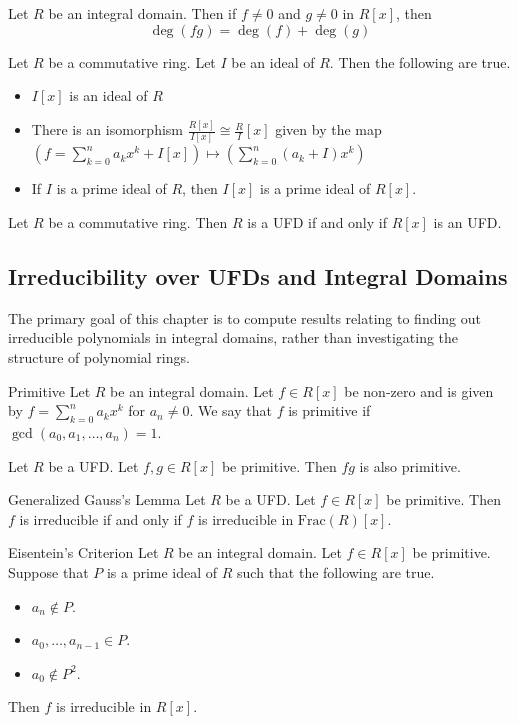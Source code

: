 \documentclass[a4paper]{article}
\begin{document}
\begin{prp}{}{} Let $R$ be an integral domain. Then if $f\neq 0$ and $g\neq 0$ in $R[x]$, then $$\deg(fg)=\deg(f)+\deg(g)$$
\end{prp}

\begin{prp}{}{} Let $R$ be a commutative ring. Let $I$ be an ideal of $R$. Then the following are true. 
\begin{itemize}
\item $I[x]$ is an ideal of $R$
\item There is an isomorphism $\frac{R[x]}{I[x]}\cong\frac{R}{I}[x]$ given by the map $\left(f=\sum_{k=0}^na_kx^k+I[x]\right)\mapsto\left(\sum_{k=0}^n(a_k+I)x^k\right)$
\item If $I$ is a prime ideal of $R$, then $I[x]$ is a prime ideal of $R[x]$. 
\end{itemize}
\end{prp}

\begin{prp}{}{} Let $R$ be a commutative ring. Then $R$ is a UFD if and only if $R[x]$ is an UFD. 
\end{prp}

\subsection{Irreducibility over UFDs and Integral Domains}
The primary goal of this chapter is to compute results relating to finding out irreducible polynomials in integral domains, rather than investigating the structure of polynomial rings. 

\begin{defn}{Primitive}{} Let $R$ be an integral domain. Let $f\in R[x]$ be non-zero and is given by $f=\sum_{k=0}^na_kx^k$ for $a_n\neq 0$. We say that $f$ is primitive if $\gcd(a_0,a_1,\dots,a_n)=1$. 
\end{defn}

\begin{prp}{}{} Let $R$ be a UFD. Let $f,g\in R[x]$ be primitive. Then $fg$ is also primitive. 
\end{prp}

\begin{thm}{Generalized Gauss's Lemma}{} Let $R$ be a UFD. Let $f\in R[x]$ be primitive. Then $f$ is irreducible if and only if $f$ is irreducible in $\text{Frac}(R)[x]$. 
\end{thm}

\begin{prp}{Eisentein's Criterion}{} Let $R$ be an integral domain. Let $f\in R[x]$ be primitive. Suppose that $P$ is a prime ideal of $R$ such that the following are true. 
\begin{itemize}
\item $a_n\notin P$. 
\item $a_0,\dots,a_{n-1}\in P$. 
\item $a_0\notin P^2$. 
\end{itemize}
Then $f$ is irreducible in $R[x]$. 
\end{prp}
\end{document}
